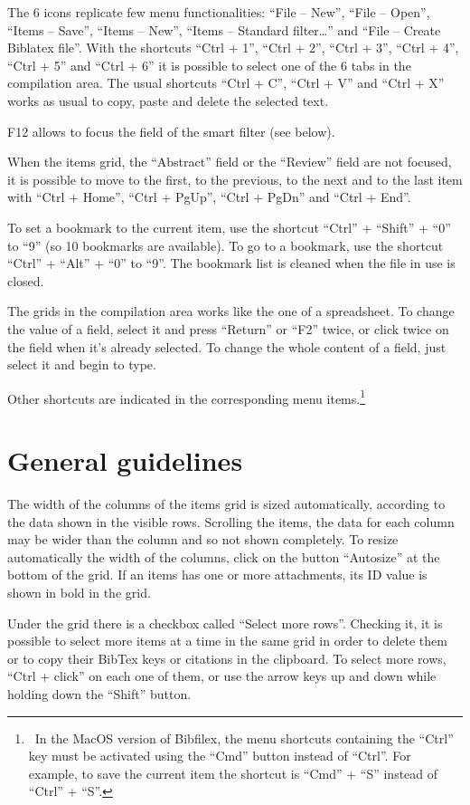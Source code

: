 \documentclass[a4paper,12pt]{report}
\begin{document}
The 6 icons replicate few menu functionalities: “File -- New”, “File -- Open”, “Items -- Save”, “Items -- New”, “Items -- Standard filter\dots” and “File --  Create Biblatex file”. With the shortcuts “Ctrl + 1”, “Ctrl + 2”, “Ctrl + 3”, “Ctrl + 4”, “Ctrl + 5” and “Ctrl + 6” it is possible to select one of the 6 tabs in the compilation area. The usual shortcuts “Ctrl + C”, “Ctrl + V” and “Ctrl + X” works as usual to copy, paste and delete the selected text.

F12 allows to focus the field of the smart filter (see below).

When the items grid, the “Abstract” field or the “Review” field are not focused, it is possible to move to the first, to the previous, to the next and to the last item with “Ctrl + Home”, “Ctrl + PgUp”, “Ctrl + PgDn” and “Ctrl + End”.

To set a bookmark to the current item, use the shortcut “Ctrl” + “Shift” + “0” to “9” (so 10 bookmarks are available). To go to a bookmark, use the shortcut “Ctrl” + “Alt” + “0” to “9”. The bookmark list is cleaned when the file in use is closed.

The grids in the compilation area works like the one of a spreadsheet. To change the value of a field, select it and press “Return” or “F2” twice, or click twice on the field when it's already selected. To change the whole content of a field, just select it and begin to type.

Other shortcuts are indicated in the corresponding menu items.\footnote{~In the MacOS version of Bibfilex, the menu shortcuts containing the “Ctrl” key must be activated using the “Cmd” button instead of “Ctrl”. For example, to save the current item the shortcut is “Cmd” + “S” instead of “Ctrl” + “S”.}

\section{General guidelines}

The width of the columns of the items grid is sized automatically, according to the data shown in the visible rows. Scrolling the items, the data for each column may be wider than the column and so not shown completely. To resize automatically the width of the columns, click on the button “Autosize” at the bottom of the grid. If an items has one or more attachments, its ID value is shown in bold in the grid.

Under the grid there is a checkbox called “Select more rows”. Checking it, it is possible to select more items at a time in the same grid in order to delete them or to copy their BibTex keys or citations in the clipboard. To select more rows, “Ctrl + click” on each one of them, or use the arrow keys up and down while holding down the “Shift” button.
\end{document}
